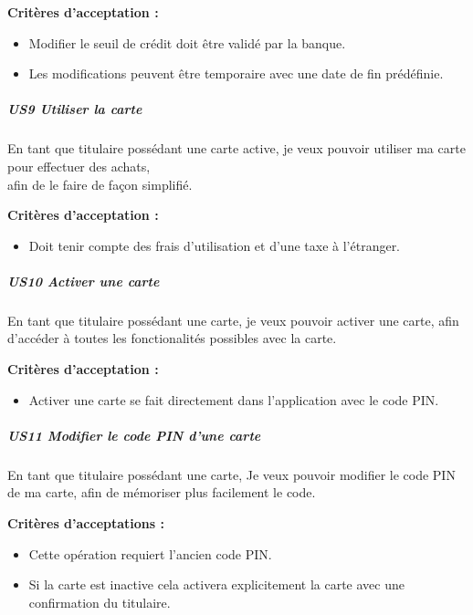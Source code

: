 \textbf{Critères d'acceptation :}

\begin{itemize}
\tightlist
\item
  Modifier le seuil de crédit doit être validé par la banque.
\item
  Les modifications peuvent être temporaire avec une date de fin
  prédéfinie.
\end{itemize}

\hypertarget{us9-utiliser-la-carte}{%
\subparagraph{US9 Utiliser la carte}\label{us9-utiliser-la-carte}}

En tant que titulaire possédant une carte active, je veux pouvoir
utiliser ma carte pour effectuer des achats,\\
afin de le faire de façon simplifié.

\textbf{Critères d'acceptation :}

\begin{itemize}
\tightlist
\item
  Doit tenir compte des frais d'utilisation et d'une taxe à l'étranger.
\end{itemize}

\hypertarget{us10-activer-une-carte}{%
\subparagraph{US10 Activer une carte}\label{us10-activer-une-carte}}

En tant que titulaire possédant une carte, je veux pouvoir activer une
carte, afin d'accéder à toutes les fonctionalités possibles avec la
carte.

\textbf{Critères d'acceptation :}

\begin{itemize}
\tightlist
\item
  Activer une carte se fait directement dans l'application avec le code
  PIN.
\end{itemize}

\hypertarget{us11-modifier-le-code-pin-dune-carte}{%
\subparagraph{US11 Modifier le code PIN d'une
carte}\label{us11-modifier-le-code-pin-dune-carte}}

En tant que titulaire possédant une carte, Je veux pouvoir modifier le
code PIN de ma carte, afin de mémoriser plus facilement le code.

\textbf{Critères d'acceptations :}

\begin{itemize}
\tightlist
\item
  Cette opération requiert l'ancien code PIN.
\item
  Si la carte est inactive cela activera explicitement la carte avec une
  confirmation du titulaire.
\end{itemize}

